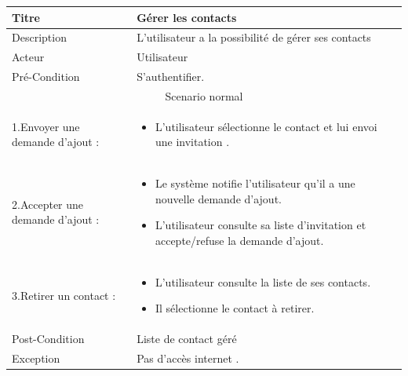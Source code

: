 \documentclass[11pt,a4paper,oneside]{book}
\begin{document}
		\begin{tabular}{ |p{4cm}|p{9cm}|  }
			
			\hline
			Titre&  Gérer les contacts\\
			\hline
			Description  & L’utilisateur a la possibilité de gérer ses contacts\\
			\hline
			Acteur& Utilisateur\\
			\hline
			Pré-Condition & S’authentifier.
			\\
			\hline
			\multicolumn{2}{|c|}{Scenario normal} \\
			\hline
			
			1.Envoyer une demande d’ajout : & \begin{itemize}
				\item L’utilisateur sélectionne le contact et lui envoi une invitation .
			\end{itemize}\\
			2.Accepter une demande d’ajout : & \begin{itemize}
				\item Le système notifie l’utilisateur qu’il a une nouvelle demande d’ajout.
				\item L’utilisateur consulte sa liste d’invitation et accepte/refuse la demande d’ajout.
			\end{itemize}\\
			3.Retirer un contact : & \begin{itemize}
				\item L’utilisateur consulte la liste de ses contacts.
				\item Il sélectionne le contact à retirer.
			\end{itemize}\\
			
			
			
			
			\hline
			Post-Condition&Liste de contact géré \\
			\hline
			Exception& Pas d’accès internet .\\
			\hline
		\end{tabular}
\end{document}
